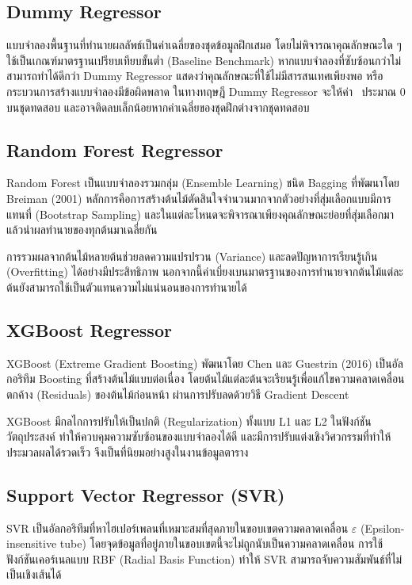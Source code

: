 \subsection{Dummy Regressor}

แบบจำลองพื้นฐานที่ทำนายผลลัพธ์เป็นค่าเฉลี่ยของชุดข้อมูลฝึกเสมอ โดยไม่พิจารณาคุณลักษณะใด ๆ ใช้เป็นเกณฑ์มาตรฐานเปรียบเทียบขั้นต่ำ (Baseline Benchmark) หากแบบจำลองที่ซับซ้อนกว่าไม่สามารถทำได้ดีกว่า Dummy Regressor แสดงว่าคุณลักษณะที่ใช้ไม่มีสารสนเทศเพียงพอ หรือกระบวนการสร้างแบบจำลองมีข้อผิดพลาด ในทางทฤษฎี Dummy Regressor จะให้ค่า \Rsq\ ประมาณ 0 บนชุดทดสอบ และอาจติดลบเล็กน้อยหากค่าเฉลี่ยของชุดฝึกต่างจากชุดทดสอบ

\subsection{Random Forest Regressor}

Random Forest เป็นแบบจำลองรวมกลุ่ม (Ensemble Learning) ชนิด Bagging ที่พัฒนาโดย Breiman (2001) หลักการคือการสร้างต้นไม้ตัดสินใจจำนวนมากจากตัวอย่างที่สุ่มเลือกแบบมีการแทนที่ (Bootstrap Sampling) และในแต่ละโหนดจะพิจารณาเพียงคุณลักษณะย่อยที่สุ่มเลือกมา แล้วนำผลทำนายของทุกต้นมาเฉลี่ยกัน

การรวมผลจากต้นไม้หลายต้นช่วยลดความแปรปรวน (Variance) และลดปัญหาการเรียนรู้เกิน (Overfitting) ได้อย่างมีประสิทธิภาพ นอกจากนี้ค่าเบี่ยงเบนมาตรฐานของการทำนายจากต้นไม้แต่ละต้นยังสามารถใช้เป็นตัวแทนความไม่แน่นอนของการทำนายได้

\subsection{XGBoost Regressor}

XGBoost (Extreme Gradient Boosting) พัฒนาโดย Chen และ Guestrin (2016) เป็นอัลกอริทึม Boosting ที่สร้างต้นไม้แบบต่อเนื่อง โดยต้นไม้แต่ละต้นจะเรียนรู้เพื่อแก้ไขความคลาดเคลื่อนตกค้าง (Residuals) ของต้นไม้ก่อนหน้า ผ่านการปรับลดด้วยวิธี Gradient Descent

XGBoost มีกลไกการปรับให้เป็นปกติ (Regularization) ทั้งแบบ L1 และ L2 ในฟังก์ชันวัตถุประสงค์ ทำให้ควบคุมความซับซ้อนของแบบจำลองได้ดี และมีการปรับแต่งเชิงวิศวกรรมที่ทำให้ประมวลผลได้รวดเร็ว จึงเป็นที่นิยมอย่างสูงในงานข้อมูลตาราง

\subsection{Support Vector Regressor (SVR)}

SVR เป็นอัลกอริทึมที่หาไฮเปอร์เพลนที่เหมาะสมที่สุดภายในขอบเขตความคลาดเคลื่อน $\varepsilon$ (Epsilon-insensitive tube) โดยจุดข้อมูลที่อยู่ภายในขอบเขตนี้จะไม่ถูกนับเป็นความคลาดเคลื่อน การใช้ฟังก์ชันเคอร์เนลแบบ RBF (Radial Basis Function) ทำให้ SVR สามารถจับความสัมพันธ์ที่ไม่เป็นเชิงเส้นได้

